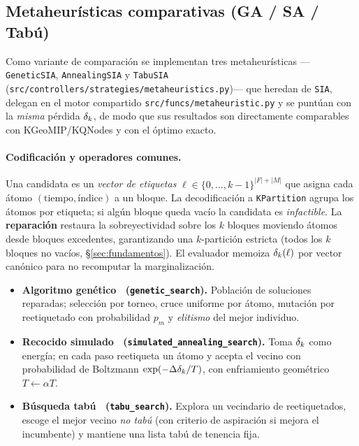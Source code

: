 \documentclass[11pt,letterpaper]{article}
\begin{document}
\subsection{Metaheurísticas comparativas (GA / SA / Tabú)}
\label{sec:metaheur}
\label{sec:metaheuristicas}
Como variante de comparación se implementan tres metaheurísticas
---\texttt{GeneticSIA}, \texttt{AnnealingSIA} y \texttt{TabuSIA}
(\texttt{src/controllers/strategies/metaheuristics.py})--- que heredan de
\texttt{SIA}, delegan en el motor compartido \texttt{src/funcs/metaheuristic.py} y se
puntúan con la \emph{misma} pérdida $\delta_k$, de modo que sus resultados son
directamente comparables con KGeoMIP/KQNodes y con el óptimo exacto.

\paragraph{Codificación y operadores comunes.} Una candidata es un \emph{vector de
	etiquetas} $\ell \in \{0,\dots,k-1\}^{|F|+|M|}$ que asigna cada átomo
$(\text{tiempo},\text{índice})$ a un bloque. La decodificación a \texttt{KPartition}
agrupa los átomos por etiqueta; si algún bloque queda vacío la candidata es
\emph{infactible}. La \textbf{reparación} restaura la sobreyectividad sobre los $k$
bloques moviendo átomos desde bloques excedentes, garantizando una $k$-partición
estricta (todos los $k$ bloques no vacíos, §\ref{sec:fundamentos}). El evaluador memoiza $\delta_k(\ell)$ por vector
canónico para no recomputar la marginalización.

\begin{itemize}
	\item \textbf{Algoritmo genético~\cite{holland} (\texttt{genetic\_search}).} Población
	      de soluciones reparadas; selección por torneo, cruce uniforme por átomo, mutación
	      por reetiquetado con probabilidad $p_m$ y \emph{elitismo} del mejor individuo.
	\item \textbf{Recocido simulado~\cite{kirkpatrick} (\texttt{simulated\_annealing\_search}).}
	      Toma $\delta_k$ como energía; en cada paso reetiqueta un átomo y acepta el vecino con
	      probabilidad de Boltzmann $\exp(-\Delta\delta_k/T)$, con enfriamiento geométrico
	      $T \leftarrow \alpha T$.
	\item \textbf{Búsqueda tabú~\cite{glover} (\texttt{tabu\_search}).} Explora un vecindario
	      de reetiquetados, escoge el mejor vecino \emph{no tabú} (con criterio de aspiración
	      si mejora el incumbente) y mantiene una lista tabú de tenencia fija.
\end{itemize}
\end{document}
